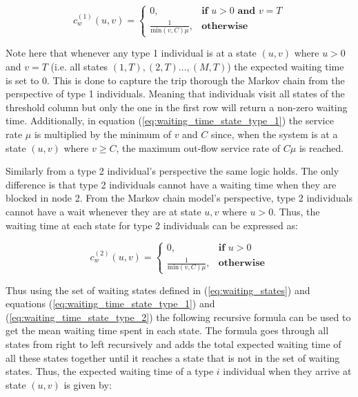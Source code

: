 \begin{equation}\label{eq:waiting_time_state_type_1}
    c^{(1)}_w(u,v) =
    \begin{cases}
        0, & \textbf{if } u > 0 \textbf{ and } v = T \\
        \frac{1}{\text{min}(v,C)\mu}, & \textbf{otherwise}
    \end{cases}
\end{equation}

Note here that whenever any type 1 individual is at a state \((u,v)\) where
\(u > 0\) and \(v = T\) (i.e. all states \((1,T), (2,T) \dots, (M,T)\)) the
expected waiting time is set to \(0\).
This is done to capture the trip thorough the Markov chain from the perspective
of type 1 individuals.
Meaning that individuals visit all states of the threshold column but only the
one in the first row will return a non-zero waiting time.
Additionally, in equation (\ref{eq:waiting_time_state_type_1}) the service rate
\(\mu\) is multiplied by the minimum of \(v\) and \(C\) since, when the system
is at a state \((u,v)\) where \(v \geq C\), the maximum out-flow service rate
of \( C \mu \) is reached.


Similarly from a type 2 individual's perspective the same logic holds.
The only difference is that type 2 individuals cannot have a waiting time when
they are blocked in node 2.
From the Markov chain model's perspective, type 2 individuals cannot have a wait
whenever they are at state \(u, v\) where \(u > 0\).
Thus, the waiting time at each state for type 2 individuals can be expressed as:

\begin{equation}\label{eq:waiting_time_state_type_2}
    c^{(2)}_w(u,v) =
    \begin{cases}
        0, & \textbf{if } u > 0 \\
        \frac{1}{\text{min}(v, C)\mu}, & \textbf{otherwise}
    \end{cases}
\end{equation}


Thus using the set of waiting states defined in (\ref{eq:waiting_states}) and
equations (\ref{eq:waiting_time_state_type_1}) and
(\ref{eq:waiting_time_state_type_2}) the following recursive formula can be used
to get the mean waiting time spent in each state.
The formula goes through all states from right to left recursively and adds the
total expected waiting time of all these states together until it reaches a
state that is not in the set of waiting states.
Thus, the expected waiting time of a type \(i\) individual when they arrive at
state \( (u,v) \) is given by:

